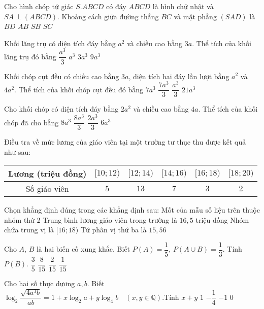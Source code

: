 \begin{ex}
Cho hình chóp tứ giác $S.ABCD$ có đáy $ABCD$ là hình chữ nhật và $SA\perp (ABCD)$. Khoảng cách giữa đường thẳng $BC$ và mặt phẳng $(SAD)$ là
\choice
{$BD$}
{\True $AB$}
{$SB$}
{$SC$}
\end{ex}
\begin{ex}
Khối lăng trụ có diện tích đáy bằng $a^2$ và chiều cao bằng $3a$. Thể tích của khối lăng trụ đó bằng
\choice
{$\dfrac{a^3}{3}$}
{$a^3$}
{\True $3a^3$}
{$9a^3$}
\end{ex}
\begin{ex}
Khối chóp cụt đều có chiều cao bằng $3a$, diện tích hai đáy lần lượt bằng $a^2$ và $4a^2$. Thể tích của khối chóp cụt đều đó bằng
\choice
{\True $7a^3$}
{$\dfrac{7a^3}{3}$}
{$\dfrac{a^3}{3}$}
{$21a^3$}
\end{ex}
\begin{ex}
Cho khối chóp có diện tích đáy bằng $2a^2$ và chiều cao bằng $4a$. Thể tích của khối chóp đã cho bằng
\choice
{$8a^3$}
{\True $\dfrac{8a^3}{3}$}
{$\dfrac{2a^3}{3}$}
{$6a^3$}
\end{ex}
\begin{ex}
Điều tra về mức lương của giáo viên tại một trường tư thục thu được kết quả như sau:
\begin{center}
\begin{tabular}{|c|c|c|c|c|c|}
\hline
Lương (triệu đồng) & $[10;12)$ & $[12;14)$ & $[14;16)$ & $[16;18)$& $[18;20)$ \\
\hline
Số giáo viên & $5$ & $13$ & $7$ & $3$ & $2$\\
\hline
\end{tabular}
\end{center}
Chọn khẳng định đúng trong các khẳng định sau:
\choice
{\True Mốt của mẫu số liệu trên thuộc nhóm thứ 2}
{Trung bình lương giáo viên trong trường là $16{,}5$ triệu đồng}
{Nhóm chứa trung vị là $[16;18)$}
{Tứ phân vị thứ ba là $15{,}56$}
\end{ex}
\begin{ex}
Cho $A$, $B$ là hai biến cố xung khắc. Biết $P(A)=\dfrac{1}{5}$, $P\left(A\cup B\right)=\dfrac{1}{3}$. Tính $P(B)$.
\choice
{$\dfrac{3}{5}$}
{$\dfrac{8}{15}$}
{\True $\dfrac{2}{15}$}
{$\dfrac{1}{15}$}
\end{ex}
\begin{ex}
Cho hai số thực dương $a,b$. Biết $\log_2\dfrac{\sqrt{4a^3b}}{ab}=1+x\log_2a+y\log_4b\quad (x,y\in \mathbb{Q})$.Tính $x+y$
\choice
{$1$}
{$-\dfrac{1}{4}$}
{$-1$}
{\True $0$}
\end{ex}
